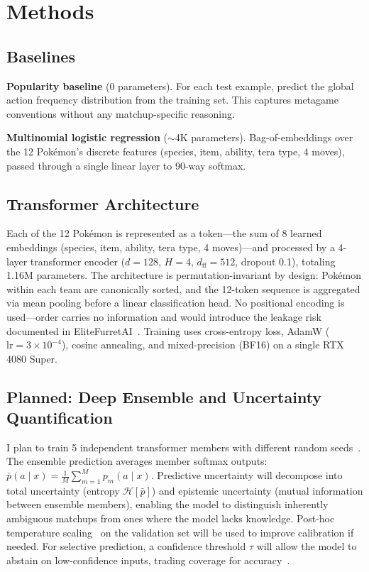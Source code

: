 \documentclass[11pt]{article}
\begin{document}
\section{Methods}
\label{sec:methods}

\subsection{Baselines}

\textbf{Popularity baseline} (0 parameters).
For each test example, predict the global action frequency distribution from the training set.
This captures metagame conventions without any matchup-specific reasoning.

\textbf{Multinomial logistic regression} (${\sim}$4K parameters).
Bag-of-embeddings over the 12 Pok\'emon's discrete features (species, item, ability, tera type, 4 moves), passed through a single linear layer to 90-way softmax.

\subsection{Transformer Architecture}

Each of the 12 Pok\'emon is represented as a token---the sum of 8 learned embeddings (species, item, ability, tera type, 4 moves)---and processed by a 4-layer transformer encoder ($d{=}128$, $H{=}4$, $d_\text{ff}{=}512$, dropout 0.1), totaling 1.16M parameters.
The architecture is permutation-invariant by design: Pok\'emon within each team are canonically sorted, and the 12-token sequence is aggregated via mean pooling before a linear classification head.
No positional encoding is used---order carries no information and would introduce the leakage risk documented in EliteFurretAI~\cite{elitefurretai}.
Training uses cross-entropy loss, AdamW ($\text{lr}{=}3{\times}10^{-4}$), cosine annealing, and mixed-precision (BF16) on a single RTX 4080 Super.

\subsection{Planned: Deep Ensemble and Uncertainty Quantification}

I plan to train 5 independent transformer members with different random seeds~\cite{deepensembles}.
The ensemble prediction averages member softmax outputs: $\bar{p}(a \mid x) = \frac{1}{M}\sum_{m=1}^{M} p_m(a \mid x)$.
Predictive uncertainty will decompose into total uncertainty (entropy $\mathcal{H}[\bar{p}]$) and epistemic uncertainty (mutual information between ensemble members), enabling the model to distinguish inherently ambiguous matchups from ones where the model lacks knowledge.
Post-hoc temperature scaling~\cite{calibration} on the validation set will be used to improve calibration if needed.
For selective prediction, a confidence threshold $\tau$ will allow the model to abstain on low-confidence inputs, trading coverage for accuracy~\cite{selectivepred}.
\end{document}

